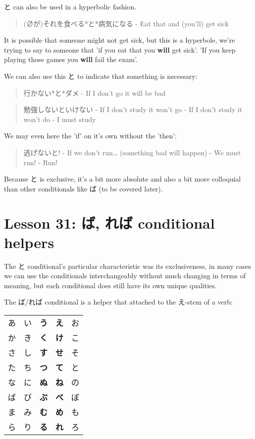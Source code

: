 \documentclass[11pt]{article}
\begin{document}
と can also be used in a hyperbolic fashion.
\begin{quote}
(∅が)それを食べる*と*病気になる - Eat that and (you'll) get sick
\end{quote}
It is possible that someone might not get sick, but this is a hyperbole, we're trying to say to someone that 'if you eat that you \textbf{will} get sick'. 'If you keep playing those games you \textbf{will} fail the exam'.

We can also use this と to indicate that something is necessary:
\begin{quote}
行かない*と*ダメ - If I don't go it will be bad
\end{quote}
\begin{quote}
勉強しないといけない - If I don't study it won't go - If I don't study it won't do - I must study
\end{quote}

We may even here the 'if' on it's own without the 'then':
\begin{quote}
逃げないと! - If we don't run\ldots{} (something bad will happen) - We must run! - Run!
\end{quote}

Because と is exclusive, it's a bit more absolute and also a bit more colloquial than other conditionals like ば (to be covered later).

\section{Lesson 31: ば, れば conditional helpers}
\label{sec:org756bbd6}
The と conditional's particular characteristic was its exclusiveness, in many cases we can use the conditionals interchangeably without much changing in terms of meaning, but each conditional does still have its own unique qualities.

The ば/れば conditional is a helper that attached to the え-stem of a verb:
\begin{center}
\begin{tabular}{lllll}
あ & い & \textbf{う} & \textbf{え} & お\\
か & き & \textbf{く} & \textbf{け} & こ\\
さ & し & \textbf{す} & \textbf{せ} & そ\\
た & ち & \textbf{つ} & \textbf{て} & と\\
な & に & \textbf{ぬ} & \textbf{ね} & の\\
ば & び & \textbf{ぶ} & \textbf{べ} & ぼ\\
ま & み & \textbf{む} & \textbf{め} & も\\
ら & り & \textbf{る} & \textbf{れ} & ろ\\
\end{tabular}
\end{center}
\end{document}
